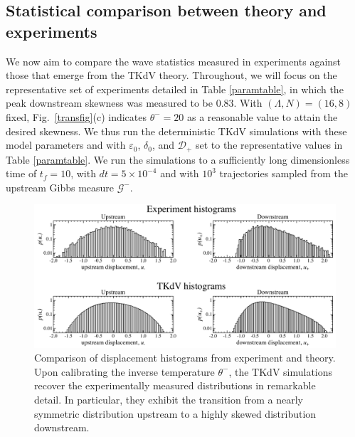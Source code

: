 \documentclass[11pt]{article}
\newcommand{\eps}{\varepsilon}
\newcommand{\lamfac}{N}
\newcommand{\drat}{\mathcal{D}}
\newcommand{\dratdn}{\drat_+}
\newcommand{\epsup}{\eps_0}
\newcommand{\delup}{\delta_0}
\newcommand{\Gibbs}{\mathcal{G}}
\newcommand{\Gup}{\Gibbs^{-}}
\newcommand{\thup}{\theta^{-}}
\begin{document}
\subsection{Statistical comparison between theory and experiments}

	We now aim to compare the wave statistics measured in experiments against those that emerge from the TKdV theory. Throughout, we will focus on the representative set of experiments detailed in Table \ref{paramtable}, in which the peak downstream skewness was measured to be 0.83. 
With $(\Lambda, \lamfac) = (16, 8)$ fixed, Fig.~\ref{transfig}(c) indicates $\thup = 20$ as a reasonable value to attain the desired skewness. We thus run the deterministic TKdV simulations with these model parameters and with $\epsup$, $\delup$, and $\dratdn$ set to the representative values in Table \ref{paramtable}. We run the simulations to a sufficiently long dimensionless time of $t_{f} = 10$, with $dt = 5 \times 10^{-4}$ and with $10^3$ trajectories sampled from the upstream Gibbs measure $\Gup$.

\begin{figure}%
\begin{center}
\includegraphics[width = 0.99 \linewidth]{Figs/uhist.pdf}
\caption{ 
Comparison of displacement histograms from experiment and theory. Upon calibrating the inverse temperature $\thup$, the TKdV simulations recover the experimentally measured distributions in remarkable detail. In particular, they exhibit the transition from a nearly symmetric distribution upstream to a highly skewed distribution downstream.
}
\label{uhist}
\end{center}
\end{figure}
 
\end{document}
